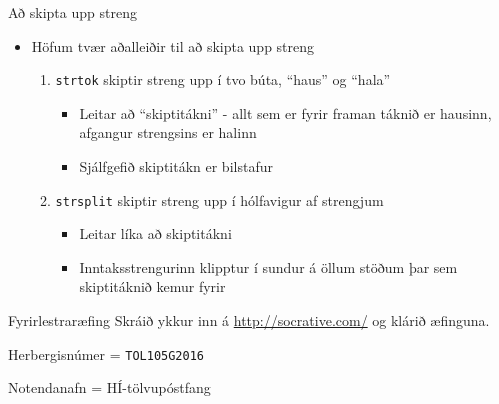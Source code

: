 \documentclass[handout]{beamer}
\begin{document}
\begin{frame}[fragile]{Að skipta upp streng}
\begin{itemize}
 \item Höfum tvær aðalleiðir til að skipta upp streng
 \begin{enumerate}
  \item \texttt{strtok} skiptir streng upp í tvo búta, ``haus'' og ``hala''
  \begin{itemize}
   \item Leitar að ``skiptitákni'' - allt sem er fyrir framan táknið er hausinn, afgangur strengsins er halinn
   \item Sjálfgefið skiptitákn er bilstafur
  \end{itemize}
  \item \texttt{strsplit} skiptir streng upp í hólfavigur af strengjum
  \begin{itemize}
   \item Leitar líka að skiptitákni
   \item Inntaksstrengurinn klipptur í sundur á öllum stöðum þar sem skiptitáknið kemur fyrir
  \end{itemize}
 \end{enumerate}
\end{itemize}
\end{frame}

\begin{frame}{Fyrirlestraræfing}
Skráið ykkur inn á \url{http://socrative.com/} og klárið æfinguna.

Herbergisnúmer = \texttt{TOL105G2016}

Notendanafn = HÍ-tölvupóstfang
\end{frame}
\end{document}
